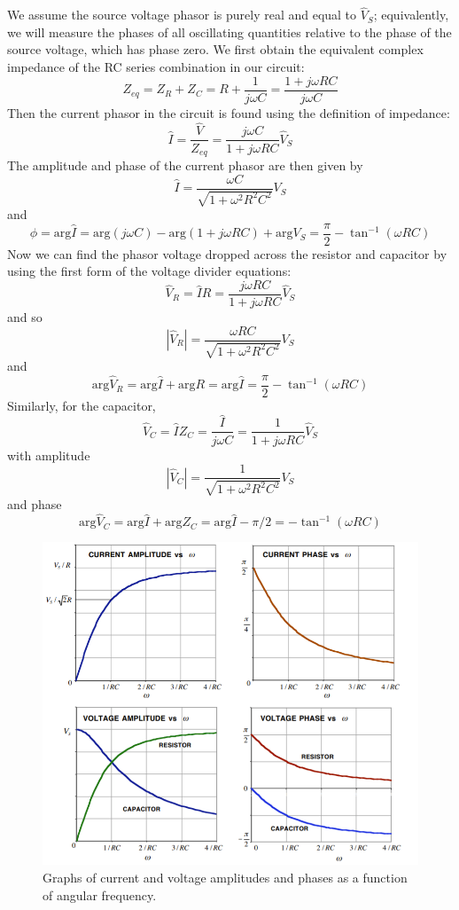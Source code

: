 \documentclass[12pt, a4paper, oneside, openright, titlepage]{book}
\begin{document}
We assume the source voltage phasor is purely real and equal to $\hat{V}_S$; equivalently, we will measure the phases of all oscillating quantities relative to the phase of the source voltage, which has phase zero. We first obtain the equivalent complex impedance of the RC series combination in our circuit: $$Z_{eq} = Z_R + Z_C = R + \frac{1}{j\omega C} = \frac{1+j\omega RC}{j\omega C}$$ 
Then the current phasor in the circuit is found using the definition of impedance: $$\hat{I} = \frac{\hat{V}}{Z_{eq}} = \frac{j\omega C}{1+j\omega RC}\hat{V}_S$$
The amplitude and phase of the current phasor are then given by \begin{equation*}
    \hat{I} = \frac{\omega C}{\sqrt{1+\omega^2R^2C^2}}V_S
\end{equation*}
and \begin{equation*}
    \phi = \text{arg}\hat{I} = \text{arg}(j\omega C) - \text{arg}(1+j\omega RC) + \text{arg}V_S = \frac{\pi}{2} - \tan^{-1}(\omega RC)
\end{equation*}
Now we can find the phasor voltage dropped across the resistor and capacitor by using the first form of the voltage divider equations: $$\hat{V}_R = \hat{I}R = \frac{j\omega RC}{1+j\omega RC}\hat{V}_S$$
and so $$|\hat{V}_R| = \frac{\omega RC}{\sqrt{1+\omega^2R^2C^2}}V_S$$
and $$\text{arg}\hat{V}_R = \text{arg}\hat{I}+\text{arg}R = \text{arg}\hat{I} = \frac{\pi}{2} - \tan^{-1}(\omega RC)$$
Similarly, for the capacitor, $$\hat{V}_C = \hat{I}Z_C = \frac{\hat{I}}{j\omega C} = \frac{1}{1+j\omega RC}\hat{V}_S$$ with amplitude $$|\hat{V}_C| = \frac{1}{\sqrt{1+\omega^2R^2C^2}}V_S$$
and phase $$\text{arg}\hat{V}_C = \text{arg}\hat{I} + \text{arg}Z_C = \text{arg}\hat{I} - \pi/2 = - \tan^{-1}(\omega RC)$$

\begin{figure}[H]
    \centering
    \includegraphics[scale = 0.8]{Images/RCGraph.PNG}
    \caption{Graphs of current and voltage amplitudes and phases as a function of angular frequency.}
    \label{fig:RCGraph}
\end{figure}
\end{document}
